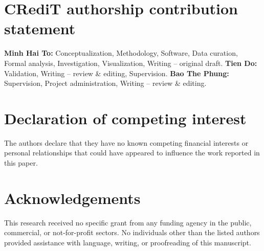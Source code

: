 \documentclass[times,review,10pt]{elsarticle}
\renewcommand{\_}{\textunderscore\allowbreak}
\begin{document}


\section*{CRediT authorship contribution statement}
\textbf{Minh Hai To:} Conceptualization, Methodology, Software, Data curation, Formal analysis, Investigation, Visualization, Writing -- original draft.
\textbf{Tien Do:} Validation, Writing -- review \& editing, Supervision.
\textbf{Bao The Phung:} Supervision, Project administration, Writing -- review \& editing.


\section*{Declaration of competing interest}
The authors declare that they have no known competing financial interests or personal relationships that could have appeared to influence the work reported in this paper.

\section*{Acknowledgements}
This research received no specific grant from any funding agency in the public, commercial, or not-for-profit sectors. No individuals other than the listed authors provided assistance with language, writing, or proofreading of this manuscript.


\end{document}
